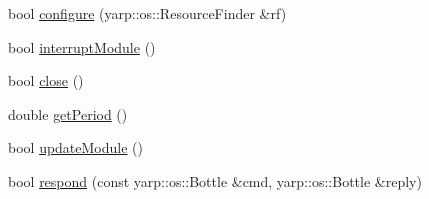 \begin{DoxyCompactItemize}
bool \hyperlink{classproactiveTagging_aff877a5a6351b04b96a9c2d5649bc89a}{configure} (yarp\+::os\+::\+Resource\+Finder \&rf)
\item 
bool \hyperlink{classproactiveTagging_aaf4c0db3e658e44211ea8ccd3e0e91dc}{interrupt\+Module} ()
\item 
bool \hyperlink{classproactiveTagging_aed2dea4a5b6aef473d4975699d374104}{close} ()
\item 
double \hyperlink{classproactiveTagging_a0535c03567fa716dbcb91b5a801be0ff}{get\+Period} ()
\item 
bool \hyperlink{classproactiveTagging_a024bbe02d942466a0b96dac527d170e0}{update\+Module} ()
\item 
bool \hyperlink{classproactiveTagging_a6d7c50fb7e1b26cd1c7d757ef3640359}{respond} (const yarp\+::os\+::\+Bottle \&cmd, yarp\+::os\+::\+Bottle \&reply)
\end{DoxyCompactItemize}
